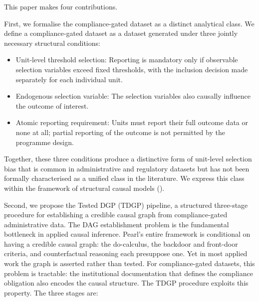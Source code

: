 This paper makes four contributions.

First, we formalise the compliance-gated dataset as a distinct analytical class. We define a compliance-gated dataset as a dataset generated under three jointly necessary structural conditions:

\begin{itemize}
  \item Unit-level threshold selection: Reporting is mandatory only if observable selection variables exceed fixed thresholds, with the inclusion decision made separately for each individual unit.
  \item Endogenous selection variable: The selection variables also causally influence the outcome of interest.
  \item Atomic reporting requirement: Units must report their full outcome data or none at all; partial reporting of the outcome is not permitted by the programme design.
\end{itemize}
Together, these three conditions produce a distinctive form of unit-level selection bias that is common in administrative and regulatory datasets but has not been formally characterised as a unified class in the literature. We express this class within the framework of structural causal models ().

Second, we propose the Tested DGP (TDGP) pipeline, a structured three-stage procedure for establishing a credible causal graph from compliance-gated administrative data. The DAG establishment problem is the fundamental bottleneck in applied causal inference. Pearl's entire framework is conditional on having a credible causal graph: the do-calculus, the backdoor and front-door criteria, and counterfactual reasoning each presuppose one. Yet in most applied work the graph is asserted rather than tested. For compliance-gated datasets, this problem is tractable: the institutional documentation that defines the compliance obligation also encodes the causal structure. The TDGP procedure exploits this property. The three stages are:

